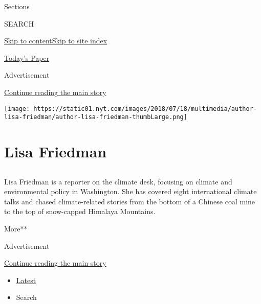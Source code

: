Sections

SEARCH

\protect\hyperlink{site-content}{Skip to
content}\protect\hyperlink{site-index}{Skip to site index}

\href{https://myaccount.nytimes.com/auth/login?response_type=cookie\&client_id=vi}{}

\href{https://www.nytimes.com/section/todayspaper}{Today's Paper}

Advertisement

\protect\hyperlink{after-top}{Continue reading the main story}

\texttt{[image: https://static01.nyt.com/images/2018/07/18/multimedia/author-lisa-friedman/author-lisa-friedman-thumbLarge.png]}

\hypertarget{lisa-friedman}{%
\section{Lisa Friedman}\label{lisa-friedman}}

\subsection{}

Lisa Friedman is a reporter on the climate desk, focusing on climate and
environmental policy in Washington. She has covered eight international
climate talks and chased climate-related stories from the bottom of a
Chinese coal mine to the top of snow-capped Himalaya Mountains.

More**

Advertisement

\protect\hyperlink{after-mid1}{Continue reading the main story}

\begin{itemize}
\tightlist
\item
  \protect\hyperlink{stream-panel}{Latest}
\item
  Search
\end{itemize}

